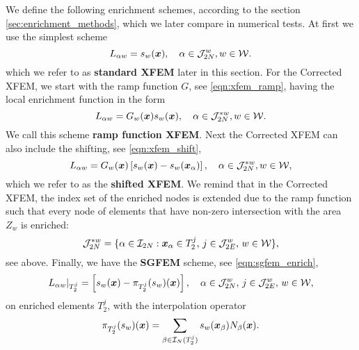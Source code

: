 We define the following enrichment schemes, according to the section \ref{sec:enrichment_methods},
which we later compare in numerical tests. At first we use the simplest scheme
\begin{equation} \label{eqn:prim_standard_xfem}
    L_{\alpha w} = s_{w}(\mathbf{\boldsymbol{x}}), \quad \alpha\in\mathcal{J}^w_{2N}, w\in\mathcal{W}.
\end{equation}
which we refer to as \textbf{standard XFEM} later in this section.
%
For the Corrected XFEM, we start with the ramp function $G$, see \eqref{eqn:xfem_ramp},
having the local enrichment function in the form
\begin{equation} \label{eqn:prim_xfem_ramp}
    L_{\alpha w} = G_w(\mathbf{\boldsymbol{x}}) s_{w}(\mathbf{\boldsymbol{x}}), \quad \alpha\in\mathcal{J}^{*w}_{2N}, w\in\mathcal{W}.
\end{equation}
We call this scheme \textbf{ramp function XFEM}.
Next the Corrected XFEM can also include the shifting, see \eqref{eqn:xfem_shift},
\begin{equation} \label{eqn:prim_xfem_shift}
    L_{\alpha w} = G_w(\mathbf{\boldsymbol{x}}) \left[s_w(\mathbf{\boldsymbol{x}}) - s_w(\mathbf{\boldsymbol{x}}_\alpha)\right],
    \quad \alpha\in\mathcal{J}^{*w}_{2N}, w\in\mathcal{W},
\end{equation} 
which we refer to as the \textbf{shifted XFEM}.
We remind that in the Corrected XFEM, the index set of the enriched nodes is extended due to the ramp function
such that every node of elements that have non-zero intersection with the area $Z_w$ is enriched:
\begin{equation} \label{eqn:prim_enriched_nodes_corr}
    \mathcal{J}^{*w}_{2N} = \{\alpha\in\mathcal{I}_{2N}: \mathbf{\boldsymbol{x}}_\alpha\in T^j_2,\, j\in\mathcal{J}^w_{2E},\, w\in\mathcal{W}\},
\end{equation}
see  above. Finally, we have the \textbf{SGFEM} scheme, see \eqref{eqn:sgfem_enrich},
\begin{equation} \label{eqn:prim_sgfem_enrich}
    L_{\alpha w}|_{T_2^j} = \left[s_w(\mathbf{\boldsymbol{x}}) - \pi_{T_2^j} (s_w)(\mathbf{\boldsymbol{x}})\right],
    \quad \alpha\in\mathcal{J}^w_{2N},\, j\in\mathcal{J}^w_{2E},\, w\in\mathcal{W},
\end{equation}
on enriched elements $T_2^j$,
with the interpolation operator
\begin{equation} \label{eqn:prim_sgfem_interpolation}
    \pi_{T_2^j} (s_w)(\mathbf{\boldsymbol{x}}) = \sum_{\beta\in\mathcal{I}_N(T_2^j)} s_w(\mathbf{\boldsymbol{x}}_\beta) N_\beta(\mathbf{\boldsymbol{x}}).
\end{equation}


